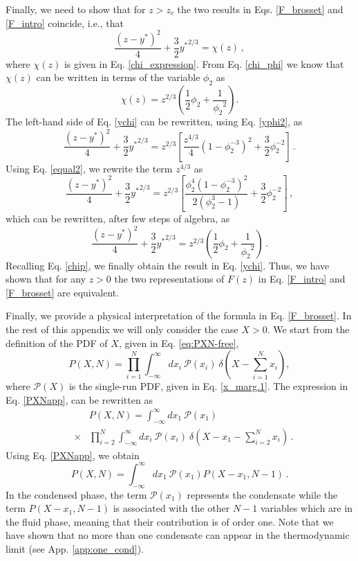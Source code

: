 \documentclass[aps,pre,twocolumn,superscriptaddress,showpacs]{revtex4-1}
\newcommand{\be}{\begin{equation}}
\newcommand{\ee}{\end{equation}}
\newcommand{\bea}{\begin{eqnarray}}
\newcommand{\eea}{\end{eqnarray}}
\newcommand{\mP}{\mathcal{P}}
\begin{document}
Finally, we need to show that for $z>z_c$ the two results in Eqs. \eqref{F_brosset} and \eqref{F_intro} coincide, i.e., that
\begin{equation}
\frac{(z-y^*)^2}{4}+\frac{3}{2}{y^*}^{2/3}=\chi(z)\,,
\label{ychi}
\end{equation}
where $\chi(z)$ is given in Eq. \eqref{chi_expression}. From Eq. \eqref{chi_phi} we know that $\chi(z)$ can be written in terms of the variable $\phi_2$ as
\begin{equation}
\chi(z)=z^{2/3}\left(\frac12 \phi_2 +\frac{1}{{\phi_2}^2}\right).
\label{chip}
\end{equation}
The left-hand side of Eq. \eqref{ychi} can be rewritten, using Eq. \eqref{yphi2}, as
\begin{equation}
\frac{(z-y^*)^2}{4}+\frac{3}{2}{y^*}^{2/3}=z^{2/3}\left[\frac{z^{4/3}}{4}(1-\phi_2^{-3})^2+\frac32 \phi_2^{-2}\right]\,.
\end{equation}
Using Eq. \eqref{equal2}, we rewrite the term $z^{4/3}$ as
\begin{equation}
\frac{(z-y^*)^2}{4}+\frac{3}{2}{y^*}^{2/3}=z^{2/3}\left[\frac{\phi_2^4(1-\phi_2^{-3})^2}{2(\phi_2^3-1)}+\frac32 \phi_2^{-2}\right]\,,
\end{equation}
which can be rewritten, after few steps of algebra, as
\begin{equation}
\frac{(z-y^*)^2}{4}+\frac{3}{2}{y^*}^{2/3}=z^{2/3}\left(\frac12 \phi_2 +\frac{1}{{\phi_2}^2}\right)\,.
\end{equation}
Recalling Eq. \eqref{chip}, we finally obtain the result in Eq. \eqref{ychi}. Thus, we have shown that for any $z>0$ the two representations of $F(z)$ in Eq. \eqref{F_intro} and \eqref{F_brosset} are equivalent.


Finally, we provide a physical interpretation of the formula in Eq. \eqref{F_brosset}. In the rest of this appendix we will only consider the case $X>0$. We start from the definition of the PDF of $X$, given in Eq. \eqref{eq:PXN-free},
\be
P(X,N) =  \prod_{i=1}^N \int_{-\infty}^{\infty}
dx_i~\mP(x_i)~\delta\left(X-\sum_{i=1}^N x_i\right),
\label{PXNapp}
\ee
where $\mP(X)$ is the single-run PDF, given in Eq. \eqref{x_marg.1}. The expression in Eq. \eqref{PXNapp}, can be rewritten as
\bea
&&P(X,N) =  \int_{-\infty}^{\infty}
dx_1~\mP(x_1)\\
&\times&  \prod_{i=2}^N \int_{-\infty}^{\infty}
dx_i~\mP(x_i)~\delta\left(X-x_1-\sum_{i=2}^N x_i\right)\,.\nonumber
\eea
Using Eq. \eqref{PXNapp}, we obtain
\begin{equation}
P(X,N) =  \int_{-\infty}^{\infty}
dx_1~\mP(x_1)P(X-x_1,N-1)\,.
\label{PXNapp2}
\end{equation}
In the condensed phase, the term $\mP(x_1)$ represents the condensate while the term $P(X-x_1,N-1)$ is associated with the other $N-1$ variables which are in the fluid phase, meaning that their contribution is of order one. Note that we have shown that no more than one condensate can appear in the thermodynamic limit (see App. \ref{app:one_cond}).
\end{document}
